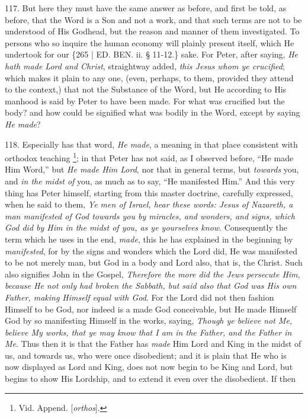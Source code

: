 117. But here they must have
the same answer as before, and first be told, as before, that the Word
is a Son and not a work, and that such terms are not to be understood
of His Godhead, but the reason and manner of them investigated. To
persons who so inquire the human economy will plainly present itself,
which He undertook for our \{265 | ED.
BEN. ii. § 11-12.\} sake. For Peter, after
saying, \emph{He hath made Lord and Christ}, straightway added, \emph{this
Jesus whom ye crucified}; which makes it plain to any one, (even,
perhaps, to them, provided they attend to the context,) that not the
Substance of the Word, but He according to His manhood is said by
Peter to have been made. For what was crucified but the body? and how
could be signified what was bodily in the Word, except by saying \emph{He
made}?

118. Especially has that word,
\emph{He made}, a meaning in that place consistent with orthodox
teaching \footnote{Vid. Append. [\emph{orthos}].}; in that Peter
has not said, as I observed before, ``He made Him Word,'' but \emph{He made
Him Lord}, nor that in general terms, but \emph{towards} you, and \emph{in
the midst of} you, as much as to say, ``He manifested Him.'' And this
very thing has Peter himself, starting from this master doctrine,
carefully expressed, when he said to them, \emph{Ye men of Israel, hear
these words: Jesus of Nazareth, a man manifested of God towards you by
miracles, and wonders, and signs, which God did by Him in the midst of
you, as ye yourselves know}. Consequently the term which he uses in
the end, \emph{made}, this he has explained in the beginning by \emph{manifested},
for by the signs and wonders which the Lord did, He was manifested to
be not merely man, but God in a body and Lord also, that is, the
Christ. Such also signifies John in the Gospel, \emph{Therefore the more
did the Jews persecute Him, because He not only had broken the
Sabbath, but said also that God was His own Father, making Himself
equal with God}. For the Lord did not then fashion Himself to be
God, nor indeed is a made God conceivable, but He made Himself God by
so manifesting Himself in the works, saying, \emph{Though ye believe not
Me, believe My works, that ye may know that I am in the Father, and
the Father in Me}. Thus then it is that the Father has \emph{made}
Him Lord and King in the midst of us, and towards us, who were once
disobedient; and it is plain that He who is now displayed as
Lord and King, does not now begin to be King and Lord, but begins to
show His Lordship, and to extend it even over the disobedient. If then
